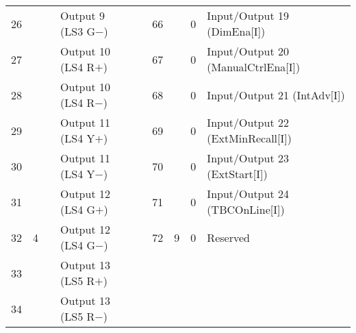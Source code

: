 \documentclass[]{article}
\begin{document}
\begin{landscape}
\begin{table}[ht]
\begin{tabular}{lllllllll}
			26           &                     &                    & Output 9 (LS3 G$-$)            &                    & 66                       &                                            & 0                                          & Input/Output 19 (DimEna{[}I{]})        \\
			27           &                     &                    & Output 10 (LS4 R$+$)           &                    & 67                       &                                            & 0                                          & Input/Output 20 (ManualCtrlEna{[}I{]}) \\
			28           &                     &                    & Output 10 (LS4 R$-$)           &                    & 68                       &                                            & 0                                          & Input/Output 21 (IntAdv{[}I{]})        \\
			29           &                     &                    & Output 11 (LS4 Y$+$)           &                    & 69                       &                                            & 0                                          & Input/Output 22 (ExtMinRecall{[}I{]})  \\
			30           &                     &                    & Output 11 (LS4 Y$-$)           &                    & 70                       &                                            & 0                                          & Input/Output 23 (ExtStart{[}I{]})      \\
			31           &                     &                    & Output 12 (LS4 G$+$)           &                    & 71                       &                                            & 0                                          & Input/Output 24 (TBCOnLine{[}I{]})     \\
			32           & \multirow{-8}{*}{4} & \multirow{-8}{*}{} & Output 12 (LS4 G$-$)           &                    & 72                       & \multirow{-8}{*}{9}                        & 0                                          & Reserved                               \\ \cline{1-4} \cline{6-9} 
			33           &                     &                    & Output 13 (LS5 R$+$)           &                    & \cellcolor[HTML]{C0C0C0} & \cellcolor[HTML]{C0C0C0}                   & \cellcolor[HTML]{C0C0C0}                   & \cellcolor[HTML]{C0C0C0}               \\
			34           &                     &                    & Output 13 (LS5 R$-$)           &                    & \cellcolor[HTML]{C0C0C0} & \cellcolor[HTML]{C0C0C0}                   & \cellcolor[HTML]{C0C0C0}                   & \cellcolor[HTML]{C0C0C0}               \\

\end{tabular}
\end{table}
\end{landscape}
\end{document}
